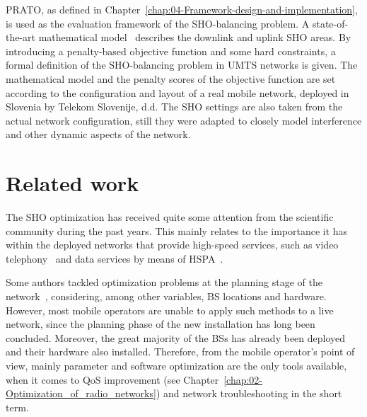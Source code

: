 \bigskip{}


PRATO, as defined in Chapter~\ref{chap:04-Framework-design-and-implementation},
is used as the evaluation framework of the SHO-balancing problem.
A state-of-the-art mathematical model~\cite{nawrocki2006understanding}
describes the downlink and uplink SHO areas. By introducing a penalty-based
objective function and some hard constraints, a formal definition
of the SHO-balancing problem in UMTS networks is given. The mathematical
model and the penalty scores of the objective function are set according
to the configuration and layout of a real mobile network, deployed
in Slovenia by Telekom Slovenije, d.d. The SHO settings are also taken
from the actual network configuration, still they were adapted to
closely model interference and other dynamic aspects of the network.


\section{Related work \label{sec:07-Related-work}}

The SHO optimization has received quite some attention from the scientific
community during the past years. This mainly relates to the importance
it has within the deployed networks that provide high-speed services,
such as video telephony~\cite{chen2010_impact_of_soft_handover}
and data services by means of HSPA~\cite{chen2008cpich,chen2011_coverage_planning_for_optimizing_HSDPA}.

Some authors tackled optimization problems at the planning stage of
the network~\cite{Eisenblatter_OptimizationMethodsForUMTSRadioNetworkPlanning,ghosh2011_optimising_CDMA_cell_planning},
considering, among other variables, BS locations and hardware. However,
most mobile operators are unable to apply such methods to a live network,
since the planning phase of the new installation has long been concluded.
Moreover, the great majority of the BSs has already been deployed
and their hardware also installed. Therefore, from the mobile operator's
point of view, mainly parameter and software optimization are the
only tools available, when it comes to QoS improvement (see Chapter~\ref{chap:02-Optimization_of_radio_networks})
and network troubleshooting in the short term.

